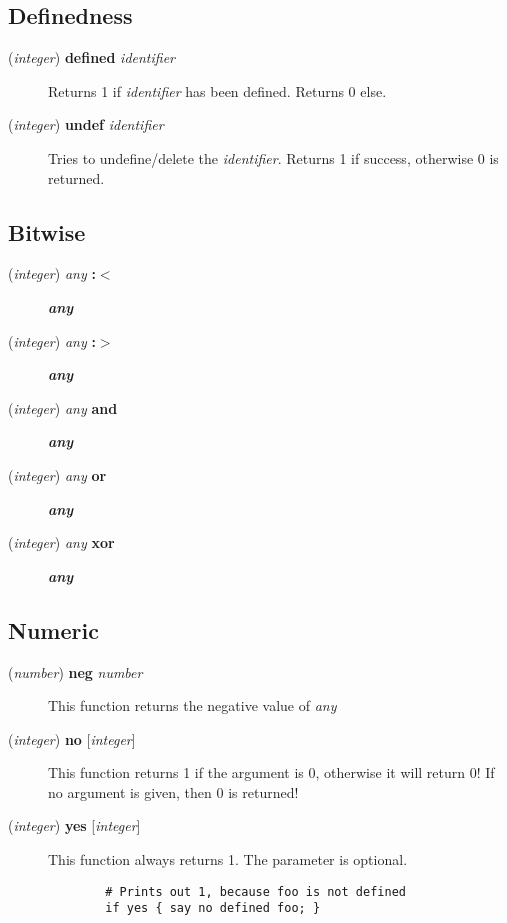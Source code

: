 \subsection*{Definedness\label{Definedness}}
\begin{description}

\item[{(\textit{integer}) \textbf{defined} \textit{identifier}}] \mbox{}

Returns 1 if \textit{identifier} has been defined. Returns 0 else.


\item[{(\textit{integer}) \textbf{undef} \textit{identifier}}] \mbox{}

Tries to undefine/delete the \textit{identifier}. Returns 1 if success, otherwise 0 is returned.

\end{description}
\subsection*{Bitwise\label{Bitwise}}
\begin{description}

\item[{(\textit{integer}) \textit{any} \textbf{:$<$}}] \textbf{\textit{any}}
\item[{(\textit{integer}) \textit{any} \textbf{:$>$}}] \textbf{\textit{any}}
\item[{(\textit{integer}) \textit{any} \textbf{and}}] \textbf{\textit{any}}
\item[{(\textit{integer}) \textit{any} \textbf{or}}] \textbf{\textit{any}}
\item[{(\textit{integer}) \textit{any} \textbf{xor}}] \textbf{\textit{any}}\end{description}
\subsection*{Numeric\label{Numeric}}
\begin{description}

\item[{(\textit{number}) \textbf{neg} \textit{number}}] \mbox{}

This function returns the negative value of \textit{any}


\item[{(\textit{integer}) \textbf{no} [\textit{integer}]}] \mbox{}

This function returns 1 if the argument is 0, otherwise it will return 0! If no
argument is given, then 0 is returned!


\item[{(\textit{integer}) \textbf{yes} [\textit{integer}]}] \mbox{}

This function always returns 1. The parameter is optional.

\begin{verbatim}
        # Prints out 1, because foo is not defined
        if yes { say no defined foo; }
\end{verbatim}
\end{description}
